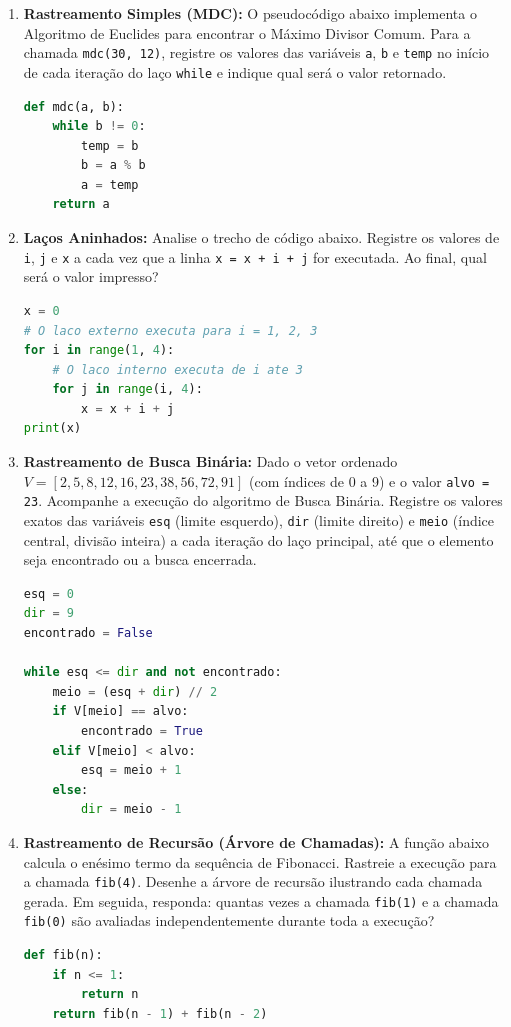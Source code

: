 \documentclass[10pt,a4paper]{article}
\begin{document}
\begin{enumerate}[leftmargin=*, itemsep=2pt, parsep=0pt, resume]
    \item \textbf{Rastreamento Simples (MDC):} O pseudocódigo abaixo implementa o Algoritmo de Euclides para encontrar o Máximo Divisor Comum. Para a chamada \texttt{mdc(30, 12)}, registre os valores das variáveis \texttt{a}, \texttt{b} e \texttt{temp} no início de cada iteração do laço \texttt{while} e indique qual será o valor retornado.
\begin{lstlisting}[language=Python]
def mdc(a, b):
    while b != 0:
        temp = b
        b = a % b
        a = temp
    return a
\end{lstlisting}

    \item \textbf{Laços Aninhados:} Analise o trecho de código abaixo. Registre os valores de \texttt{i}, \texttt{j} e \texttt{x} a cada vez que a linha \texttt{x = x + i + j} for executada. Ao final, qual será o valor impresso?
\begin{lstlisting}[language=Python]
x = 0
# O laco externo executa para i = 1, 2, 3
for i in range(1, 4):      
    # O laco interno executa de i ate 3
    for j in range(i, 4):  
        x = x + i + j
print(x)
\end{lstlisting}

    \item \textbf{Rastreamento de Busca Binária:} Dado o vetor ordenado $V = [2, 5, 8, 12, 16, 23, 38, 56, 72, 91]$ (com índices de 0 a 9) e o valor \texttt{alvo = 23}. Acompanhe a execução do algoritmo de Busca Binária. Registre os valores exatos das variáveis \texttt{esq} (limite esquerdo), \texttt{dir} (limite direito) e \texttt{meio} (índice central, divisão inteira) a cada iteração do laço principal, até que o elemento seja encontrado ou a busca encerrada.
\begin{lstlisting}[language=Python]
esq = 0
dir = 9
encontrado = False

while esq <= dir and not encontrado:
    meio = (esq + dir) // 2
    if V[meio] == alvo:
        encontrado = True
    elif V[meio] < alvo:
        esq = meio + 1
    else:
        dir = meio - 1
\end{lstlisting}

\item \textbf{Rastreamento de Recursão (Árvore de Chamadas):} A função abaixo calcula o enésimo termo da sequência de Fibonacci. Rastreie a execução para a chamada \texttt{fib(4)}. Desenhe a árvore de recursão ilustrando cada chamada gerada. Em seguida, responda: quantas vezes a chamada \texttt{fib(1)} e a chamada \texttt{fib(0)} são avaliadas independentemente durante toda a execução?
\begin{lstlisting}[language=Python]
def fib(n):
    if n <= 1:
        return n
    return fib(n - 1) + fib(n - 2)
\end{lstlisting}


\end{enumerate}
\end{document}
